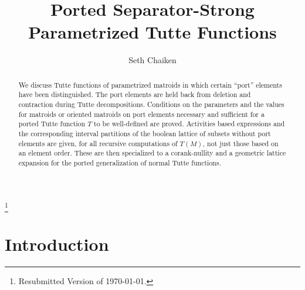 \documentclass[12pt,leqno]{amsart}
\theoremstyle{remark}
\begin{document}
\title[Ported Separator-Strong Parametrized Tutte Functions]
{Ported Separator-Strong 
Parametrized Tutte Functions}

\author{Seth Chaiken}
\address{Computer Science Department\\
The University at Albany (SUNY)\\
Albany, NY 12222, U.S.A.}



\begin{abstract}
We discuss Tutte functions of parametrized matroids in which
certain ``port'' elements have been distinguished.
The port elements are held back from deletion and contraction
during Tutte decompositions.  Conditions on the parameters
and the values for matroids or oriented matroids on port elements
necessary and sufficient for a ported Tutte function $T$ to be well-defined
are proved.  Activities based expressions and the corresponding
interval partitions of the boolean lattice of subsets
without port elements are 
given, for all recursive computations of $T(M)$, not just those
based on an element order.  These are then specialized to
a corank-nullity and a geometric lattice expansion for the ported
generalization of normal Tutte functions.
\end{abstract}





\thanks{Resubmitted Version of \today.}

\maketitle
\pagestyle{headings}


\section{Introduction}
\end{document}
